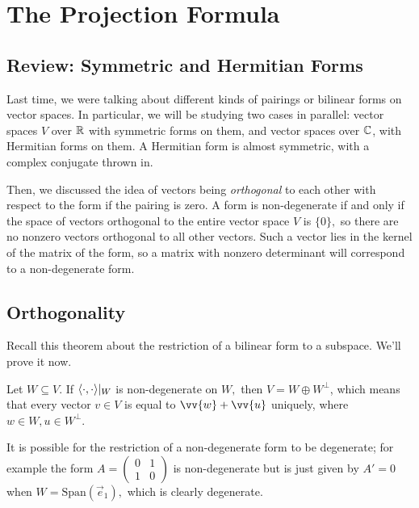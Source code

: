 
\section{The Projection Formula}
\subsection{Review: Symmetric and Hermitian Forms}
Last time, we were talking about different kinds of pairings or bilinear forms on vector spaces. In particular, we will be studying two cases in parallel: vector spaces $V$ over $\mathbb R$ with symmetric forms on them, and vector spaces over $\mathbb C$, with Hermitian forms on them. A Hermitian form is almost symmetric, with a complex conjugate thrown in.

Then, we discussed the idea of vectors being \emph{orthogonal} to each other with respect to the form if the pairing is zero. A form is non-degenerate if and only if the space of vectors orthogonal to the entire vector space $V$ is $\{0\},$ so there are no nonzero vectors orthogonal to all other vectors. Such a vector lies in the kernel of the matrix of the form, so a matrix with nonzero determinant will correspond to a non-degenerate form. 


\subsection{Orthogonality}

Recall this theorem about the restriction of a bilinear form to a subspace. We'll prove it now.
\begin{theorem}\label{non-degenerate stuff}
Let $W \subseteq V.$ If $\langle \cdot, \cdot \rangle|_W$ is non-degenerate on $W,$ then $V = W \oplus W^{\perp}$, which means that every vector $v \in V$ is equal to $\vv{w} + \vv{u}$ uniquely, where $w \in W, u \in W^\perp$. 
\end{theorem}

It is possible for the restriction of a non-degenerate form to be degenerate; for example the form $A = \begin{pmatrix}0 & 1 \\ 1 & 0\end{pmatrix}$ is non-degenerate but is just given by $A' = 0$ when $W = \text{Span}(\vec{e}_1),$ which is clearly degenerate.

